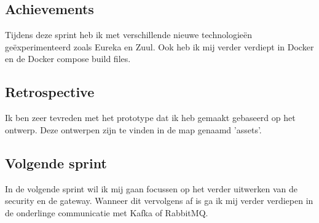 \documentclass[11pt, twoside]{report}
\begin{document}
    \subsection{Achievements}\label{subsec:achievements-2}
    Tijdens deze sprint heb ik met verschillende nieuwe technologieën geëxperimenteerd zoals Eureka en Zuul.
    Ook heb ik mij verder verdiept in Docker en de Docker compose build files.

    \subsection{Retrospective}\label{subsec:retrospective-2}
    Ik ben zeer tevreden met het prototype dat ik heb gemaakt gebaseerd op het ontwerp.
    Deze ontwerpen zijn te vinden in de map genaamd 'assets'.

    \subsection{Volgende sprint}\label{subsec:volgende-sprint-2}
    In de volgende sprint wil ik mij gaan focussen op het verder uitwerken van de security en de gateway.
    Wanneer dit vervolgens af is ga ik mij verder verdiepen in de onderlinge communicatie met Kafka of RabbitMQ.
\end{document}
